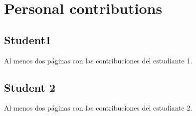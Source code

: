 \chapter*{Personal contributions}
\label{cap:contribucionesPersonales}

\section*{Student1}
Al menos dos páginas con las contribuciones del estudiante 1.

\section*{Student 2}
Al menos dos páginas con las contribuciones del estudiante 2.
